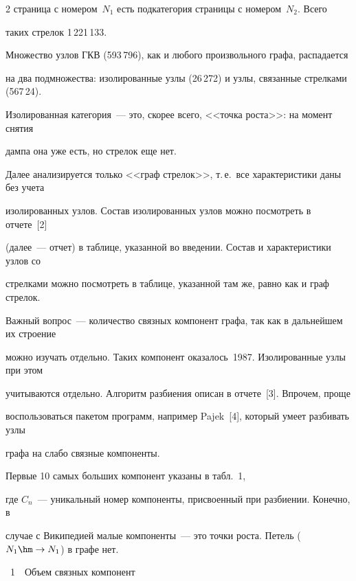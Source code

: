 \begin{multicols}{2}
страница с номером~$N_1$ есть подкатегория страницы с номером~$N_2$. Всего 

таких стрелок 1\,221\,133.

   

   Множество узлов ГКВ (593\,796), как и любого произвольного графа, распадается 

на два подмножества: изолированные узлы (26\,272) и узлы, связанные стрелками (567\,24). 

Изолированная категория~--- это, скорее всего, <<точка роста>>: на момент снятия 

дампа она уже есть, но стрелок еще нет.

   

   Далее анализируется только <<граф стрелок>>, т.\,е.\ все характеристики даны без учета 

изолированных узлов. Состав изолированных узлов можно по\-смот\-реть в отчете~[2] 

   (далее~--- отчет) в таблице, указанной во введении. Состав и характеристики узлов со 

стрелками можно посмотреть в таблице, указанной там же, равно как и граф стрелок. 

Важный вопрос~--- количество связных компонент графа, так как в дальнейшем их строение 

можно изучать отдельно. Таких компонент оказалось~1987. Изолированные узлы при этом 

учитываются отдельно. Алгоритм разбиения описан в отчете~[3]. Впрочем, проще 

воспользоваться пакетом программ, например Pajek~[4], который умеет разбивать узлы 

графа на слабо связные компоненты.

   

   Первые 10 самых больших компонент указаны в табл.~1,

где $C_n$~--- уникальный номер компоненты, присвоенный при разбиении. Конечно, в 

случае с Википедией малые компоненты~--- это точки роста. Петель ($N_1\hm\rightarrow 

N_1$) в графе нет. 

   

  \begin{center}  %


\parbox{100pt}{{\tablename~1}\ \ \small{Объем связных компонент}}




\end{center}
\end{multicols}
